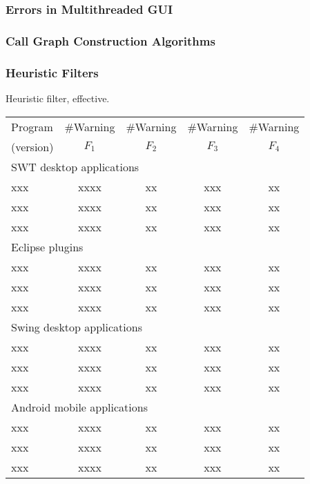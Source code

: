 \subsubsection{Errors in Multithreaded GUI}

\subsubsection{Call Graph Construction Algorithms}

\subsubsection{Heuristic Filters}

Heuristic filter, effective.

\begin{table}[t]
\begin{center}
 \fontsize{9pt}{\baselineskip}\selectfont
\hspace*{-0.2cm}
\begin{tabular}{|l||c|c|c|c|}
\hline
 Program  & \#Warning & \#Warning & \#Warning & \#Warning \\
 (version) & $F_1$ & $F_2$ & $F_3$&$F_4$ \\
\hline \hline
\multicolumn{5}{|l|}{SWT desktop applications}   \\
 \hline
 xxx &  xxxx &  xx &  xxx & xx \\
 \hline
 xxx &  xxxx &  xx &  xxx & xx \\
 \hline
 xxx &  xxxx &  xx &  xxx & xx \\
 \hline
 \hline
\multicolumn{5}{|l|}{Eclipse plugins}   \\
 \hline
 xxx &  xxxx &  xx &  xxx & xx \\
 \hline
 xxx &  xxxx &  xx &  xxx & xx \\
 \hline
 xxx &  xxxx &  xx &  xxx & xx \\
 \hline
 \hline
\multicolumn{5}{|l|}{Swing desktop applications}   \\
 \hline
 xxx &  xxxx &  xx &  xxx & xx \\
 \hline
 xxx &  xxxx &  xx &  xxx & xx \\
 \hline
 xxx &  xxxx &  xx &  xxx & xx \\
 \hline
 \hline
\multicolumn{5}{|l|}{Android mobile applications}   \\
 \hline
 xxx &  xxxx &  xx &  xxx & xx \\
 \hline
 xxx &  xxxx &  xx &  xxx & xx \\
 \hline
 xxx &  xxxx &  xx &  xxx & xx \\
\hline
\end{tabular}
\end{center}
\vspace{-15pt}
\end{table}


